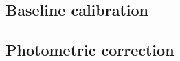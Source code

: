 \subsection{Baseline calibration}
\label{se:baseline_calibration}



\subsection{Photometric correction}
\label{se:photometric_correction}

